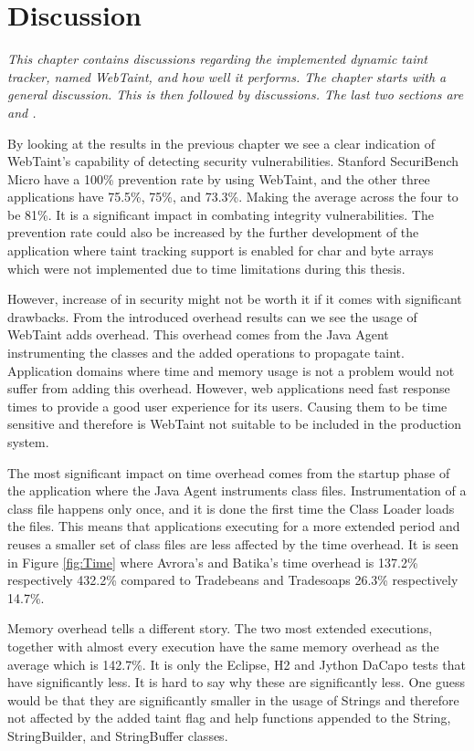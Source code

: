 \chapter{Discussion}
\label{Discussion}
\textit{This chapter contains discussions regarding the implemented dynamic taint tracker, named WebTaint, and how well it performs. The chapter starts with a general discussion. This is then followed by \textit{} discussions. The last two sections are \textit{} and \textit{}.}

By looking at the results in the previous chapter we see a clear indication of WebTaint's capability of detecting security vulnerabilities. Stanford SecuriBench Micro have a 100\% prevention rate by using WebTaint, and the other three applications have 75.5\%, 75\%, and 73.3\%. Making the average across the four to be 81\%. It is a significant impact in combating integrity vulnerabilities. The prevention rate could also be increased by the further development of the application where taint tracking support is enabled for char and byte arrays which were not implemented due to time limitations during this thesis.

However, increase of in security might not be worth it if it comes with significant drawbacks. From the introduced overhead results can we see the usage of WebTaint adds overhead. This overhead comes from the Java Agent instrumenting the classes and the added operations to propagate taint. Application domains where time and memory usage is not a problem would not suffer from adding this overhead. However, web applications need fast response times to provide a good user experience for its users. Causing them to be time sensitive and therefore is WebTaint not suitable to be included in the production system.

The most significant impact on time overhead comes from the startup phase of the application where the Java Agent instruments class files. Instrumentation of a class file happens only once, and it is done the first time the Class Loader loads the files. This means that applications executing for a more extended period and reuses a smaller set of class files are less affected by the time overhead. It is seen in Figure \ref{fig:Time} where Avrora's and Batika's time overhead is 137.2\% respectively 432.2\% compared to Tradebeans and Tradesoaps 26.3\% respectively 14.7\%.

Memory overhead tells a different story. The two most extended executions, together with almost every execution have the same memory overhead as the average which is 142.7\%. It is only the Eclipse, H2 and Jython DaCapo tests that have significantly less. It is hard to say why these are significantly less. One guess would be that they are significantly smaller in the usage of Strings and therefore not affected by the added taint flag and help functions appended to the String, StringBuilder, and StringBuffer classes.



